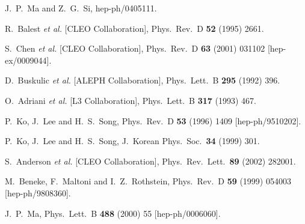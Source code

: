 \begin{thebibliography}{999}
J.~P.~Ma and Z.~G.~Si,
hep-ph/0405111.


R.~Balest {\it et al.}  [CLEO Collaboration],
Phys.\ Rev.\ D {\bf 52} (1995) 2661.

S.~Chen {\it et al.}  [CLEO Collaboration],
Phys.\ Rev.\ D {\bf 63} (2001) 031102
[hep-ex/0009044].

D.~Buskulic {\it et al.}  [ALEPH Collaboration],
Phys.\ Lett.\ B {\bf 295} (1992) 396.

O.~Adriani {\it et al.}  [L3 Collaboration],
Phys.\ Lett.\ B {\bf 317} (1993) 467.

P.~Ko, J.~Lee and H.~S.~Song,
Phys.\ Rev.\ D {\bf 53} (1996) 1409 
[hep-ph/9510202].

P.~Ko, J.~Lee and H.~S.~Song,
J.\ Korean Phys.\ Soc.\  {\bf 34} (1999) 301.

S.~Anderson {\it et al.}  [CLEO Collaboration],
Phys.\ Rev.\ Lett.\  {\bf 89} (2002) 282001.

M.~Beneke, F.~Maltoni and I.~Z.~Rothstein,
Phys.\ Rev.\ D {\bf 59} (1999) 054003
[hep-ph/9808360].

J.~P.~Ma,
Phys.\ Lett.\ B {\bf 488} (2000) 55
[hep-ph/0006060].


\end{thebibliography}
